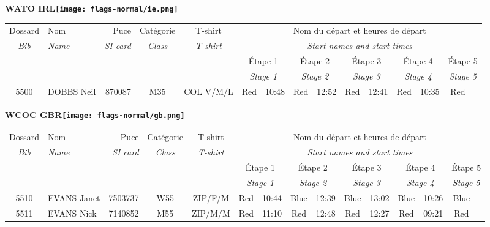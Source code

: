 \documentclass{report}
\begin{document}
\newpage
  \Huge \centering \bfseries WATO  IRL\normalfont \footnotesize \sffamily \hfill \texttt{[image: flags-normal/ie.png]} \newline 
  \begin{longtable}{|c|l|r|c|c|*{5}{cc|}}
    Dossard & Nom  & Puce    & Catégorie & T-shirt & \multicolumn{10}{c|}{Nom du départ et heures de départ} \\
    \itshape Bib     & \itshape Name & \itshape SI card & \itshape Class  & \itshape  T-shirt  & \multicolumn{10}{c|}{\itshape Start names and start times} \\
    \hline
    & & & & & \multicolumn{2}{c|}{Étape 1} & \multicolumn{2}{c|}{Étape 2} & \multicolumn{2}{c|}{Étape 3} & \multicolumn{2}{c|}{Étape 4} & \multicolumn{2}{c|}{Étape 5} \\
    & & & & & \multicolumn{2}{c|}{\itshape Stage 1} & \multicolumn{2}{c|}{\itshape Stage 2} & \multicolumn{2}{c|}{\itshape Stage 3} & \multicolumn{2}{c|}{\itshape Stage 4} & \multicolumn{2}{c|}{\itshape Stage 5} \\
    \hline
    5500 & DOBBS Neil & 870087 & M35 & COL V/M/L & Red & 10:48 & Red & 12:52 & Red & 12:41 & Red & 10:35 & Red &  \\
  \end{longtable}
\newpage
  \Huge \centering \bfseries WCOC  GBR\normalfont \footnotesize \sffamily \hfill \texttt{[image: flags-normal/gb.png]} \newline 
  \begin{longtable}{|c|l|r|c|c|*{5}{cc|}}
    Dossard & Nom  & Puce    & Catégorie & T-shirt & \multicolumn{10}{c|}{Nom du départ et heures de départ} \\
    \itshape Bib     & \itshape Name & \itshape SI card & \itshape Class  & \itshape  T-shirt  & \multicolumn{10}{c|}{\itshape Start names and start times} \\
    \hline
    & & & & & \multicolumn{2}{c|}{Étape 1} & \multicolumn{2}{c|}{Étape 2} & \multicolumn{2}{c|}{Étape 3} & \multicolumn{2}{c|}{Étape 4} & \multicolumn{2}{c|}{Étape 5} \\
    & & & & & \multicolumn{2}{c|}{\itshape Stage 1} & \multicolumn{2}{c|}{\itshape Stage 2} & \multicolumn{2}{c|}{\itshape Stage 3} & \multicolumn{2}{c|}{\itshape Stage 4} & \multicolumn{2}{c|}{\itshape Stage 5} \\
    \hline
    5510 & EVANS Janet & 7503737 & W55 & ZIP/F/M & Red & 10:44 & Blue & 12:39 & Blue & 13:02 & Blue & 10:26 & Blue &  \\
    5511 & EVANS Nick & 7140852 & M55 & ZIP/M/M & Red & 11:10 & Red & 12:48 & Red & 12:27 & Red & 09:21 & Red &  \\
  \end{longtable}
\end{document}
